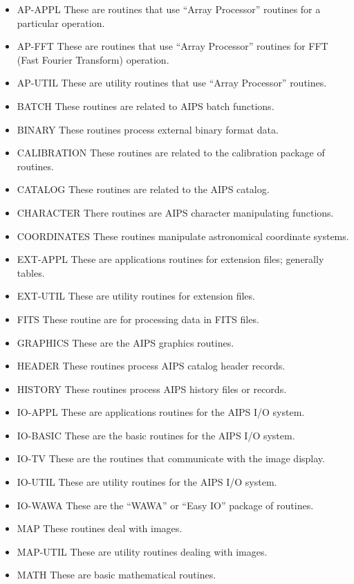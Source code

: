 \begin{itemize}  %
\item AP-APPL  These are routines that use ``Array Processor''
routines for a particular operation.
\item AP-FFT  These are routines that use ``Array Processor''
routines for FFT (Fast Fourier Transform) operation.
\item AP-UTIL  These are utility routines that use ``Array Processor''
routines.
\item BATCH  These routines are related to AIPS batch functions.
\item BINARY  These routines process external binary format data.
\item CALIBRATION  These routines are related to the calibration
package of routines.
\item CATALOG  These routines are related to the AIPS catalog.
\item CHARACTER  There routines are AIPS character manipulating
functions.
\item COORDINATES  These routines manipulate astronomical coordinate
systems.
\item EXT-APPL These are applications routines for extension files;
generally tables.
\item EXT-UTIL  These are utility routines for extension files.
\item FITS  These routine are for processing data in FITS files.
\item GRAPHICS These are the AIPS graphics routines.
\item HEADER  These routines process AIPS catalog header records.
\item HISTORY  These routines process AIPS history files or records.
\item IO-APPL  These are applications routines for the AIPS I/O system.
\item IO-BASIC  These are the basic routines for the AIPS I/O system.
\item IO-TV  These are the routines that communicate with the image
display.
\item IO-UTIL  These are utility routines for the AIPS I/O system.
\item IO-WAWA  These are the ``WAWA'' or ``Easy IO'' package of
routines.
\item MAP  These routines deal with images.
\item MAP-UTIL  These are utility routines dealing with images.
\item MATH  These are basic mathematical routines.

\end{itemize}
